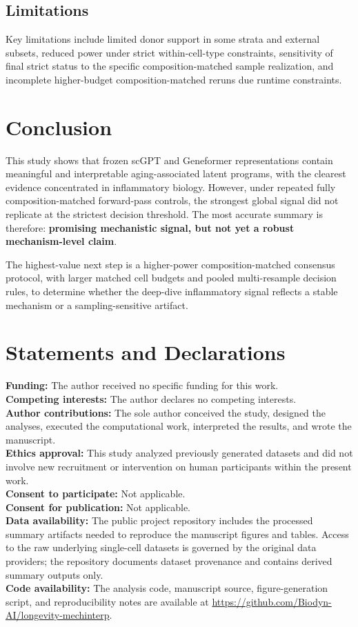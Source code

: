 \documentclass[11pt]{article}
\begin{document}
\subsection{Limitations}
Key limitations include limited donor support in some strata and external subsets, reduced power under strict within-cell-type constraints, sensitivity of final strict status to the specific composition-matched sample realization, and incomplete higher-budget composition-matched reruns due runtime constraints.

\section{Conclusion}
This study shows that frozen scGPT and Geneformer representations contain meaningful and interpretable aging-associated latent programs, with the clearest evidence concentrated in inflammatory biology. However, under repeated fully composition-matched forward-pass controls, the strongest global signal did not replicate at the strictest decision threshold. The most accurate summary is therefore: \textbf{promising mechanistic signal, but not yet a robust mechanism-level claim}.

The highest-value next step is a higher-power composition-matched consensus protocol, with larger matched cell budgets and pooled multi-resample decision rules, to determine whether the deep-dive inflammatory signal reflects a stable mechanism or a sampling-sensitive artifact.

\section*{Statements and Declarations}
\textbf{Funding:} The author received no specific funding for this work. \\
\textbf{Competing interests:} The author declares no competing interests. \\
\textbf{Author contributions:} The sole author conceived the study, designed the analyses, executed the computational work, interpreted the results, and wrote the manuscript. \\
\textbf{Ethics approval:} This study analyzed previously generated datasets and did not involve new recruitment or intervention on human participants within the present work. \\
\textbf{Consent to participate:} Not applicable. \\
\textbf{Consent for publication:} Not applicable. \\
\textbf{Data availability:} The public project repository includes the processed summary artifacts needed to reproduce the manuscript figures and tables. Access to the raw underlying single-cell datasets is governed by the original data providers; the repository documents dataset provenance and contains derived summary outputs only. \\
\textbf{Code availability:} The analysis code, manuscript source, figure-generation script, and reproducibility notes are available at \url{https://github.com/Biodyn-AI/longevity-mechinterp}. \\



\end{document}
